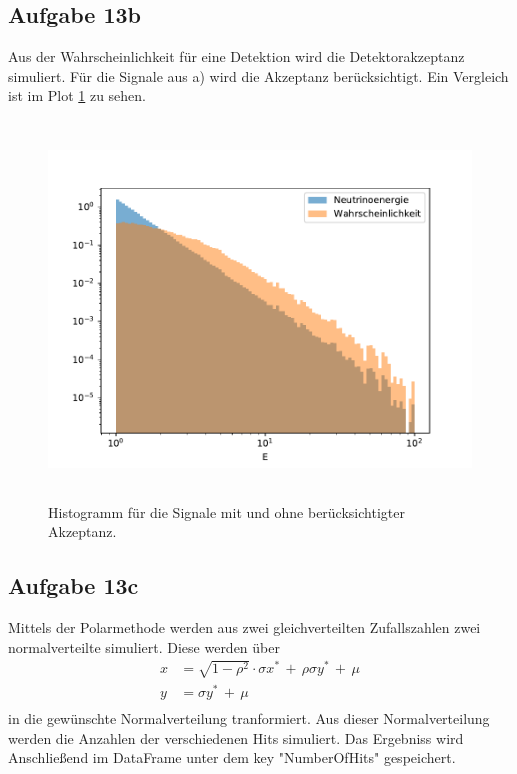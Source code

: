     \subsection{Aufgabe 13b}
    Aus der Wahrscheinlichkeit für eine Detektion wird die Detektorakzeptanz simuliert.
    Für die Signale aus a) wird die Akzeptanz berücksichtigt. Ein Vergleich ist im Plot \ref{fig:plothist}
    zu sehen.
    \begin{figure}[H]
      \centering
      \includegraphics[height=10cm]{plothist.pdf}
      \caption{Histogramm für die Signale mit und ohne berücksichtigter Akzeptanz.}
      \label{fig:plothist}
    \end{figure}

    \subsection{Aufgabe 13c}
    Mittels der Polarmethode werden aus zwei gleichverteilten Zufallszahlen zwei normalverteilte simuliert.
    Diese werden über
    \begin{align*}
      x &= \sqrt{1-\rho^2}\cdot\sigma x^{*}\, +\,\rho\sigma y^{*}\,+\,\mu\\
      y &= \sigma y^{*}\,+\,\mu\\
    \end{align*}
    in die gewünschte Normalverteilung tranformiert.
    Aus dieser Normalverteilung werden die Anzahlen der verschiedenen Hits simuliert.
    Das Ergebniss wird Anschließend im DataFrame unter dem key "NumberOfHits" gespeichert.

